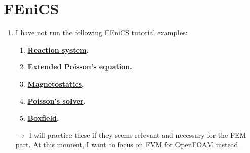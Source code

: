 \documentclass[onsided]{book}
\numberwithin{equation}{section}
\begin{document}
\section{FEniCS}
\begin{enumerate}
    \item I have not run the following FEniCS tutorial examples:
    \begin{enumerate}
        \item \textbf{\href{https://github.com/hplgit/fenics-tutorial/blob/master/pub/python/vol1/ft09_reaction_system.py}{Reaction system}.}
        \item \textbf{\href{https://github.com/hplgit/fenics-tutorial/blob/master/pub/python/vol1/ft10_poisson_extended.py}{Extended Poisson's equation}.}
        \item \textbf{\href{https://github.com/hplgit/fenics-tutorial/blob/master/pub/python/vol1/ft11_magnetostatics.py}{Magnetostatics}.}
        \item \textbf{\href{https://github.com/hplgit/fenics-tutorial/blob/master/pub/python/vol1/ft12_poisson_solver.py}{Poisson's solver}.}
        \item \textbf{\href{https://github.com/hplgit/fenics-tutorial/blob/master/src/vol1/python/boxfield.py}{Boxfield}.}
    \end{enumerate}
    $\to$ I will practice these if they seems relevant and necessary for the FEM part. At this moment, I want to focus on FVM for OpenFOAM instead.
\end{enumerate}


\printbibliography[heading=bibintoc]
\end{document}
